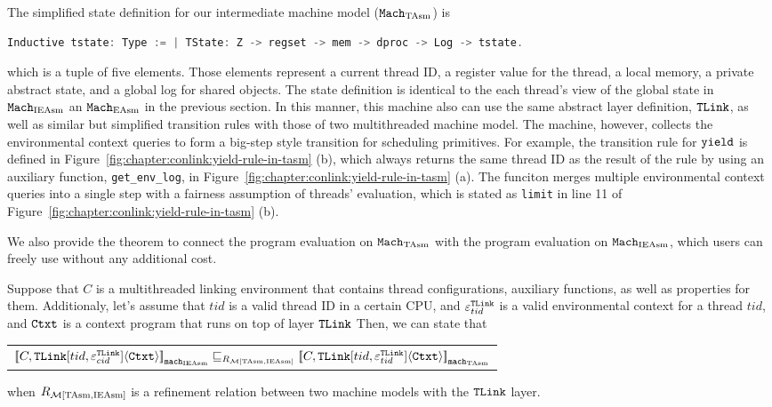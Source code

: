 The simplified state definition for our intermediate machine model (${\mathrm{\texttt{Mach}}}_{\mathrm{TAsm}}$) is
\begin{lstlisting}[language=C]
Inductive tstate: Type := | TState: Z -> regset -> mem -> dproc -> Log -> tstate.
\end{lstlisting}
which is a tuple of five elements. 
Those elements represent a current thread ID, 
a register value for the thread, a local memory, a private abstract state, and a global log for shared objects. 
The state definition is identical to the each thread's view of the global state in ${\mathrm{\texttt{Mach}}}_{\mathrm{IEAsm}}$ an ${\mathrm{\texttt{Mach}}}_{\mathrm{EAsm}}$ in the previous section. 
In this manner,
this machine also can use the same abstract layer definition, ${{\mathrm{\texttt{TLink}}}}$, 
as well as similar but simplified transition rules with those of two multithreaded machine model.
The machine, however,
 collects the environmental context queries to form a big-step style transition for scheduling primitives. 
 For example, 
 the transition rule for ${\mathrm{\texttt{yield}}}$ is defined in Figure~\ref{fig:chapter:conlink:yield-rule-in-tasm} (b),
 which always returns the same thread ID as the result of the rule 
 by using 
 an auxiliary function, \lstinline$get_env_log$, in  Figure~\ref{fig:chapter:conlink:yield-rule-in-tasm} (a).
 The funciton   merges multiple environmental context queries into a single step with a fairness assumption
 of threads' evaluation, which is stated as \lstinline$limit$ in line 11 of  Figure~\ref{fig:chapter:conlink:yield-rule-in-tasm} (b).

We also provide 
the theorem to connect the program evaluation on ${\mathrm{\texttt{Mach}}}_{\mathrm{TAsm}}$
with the program evaluation on ${\mathrm{\texttt{Mach}}}_{\mathrm{IEAsm}}$,
which users can freely use without any additional cost.

\begin{lemma}
\label{lemma:chapter:conlink:ieasm-refines-tasm}
Suppose that $C$ is a multithreaded linking environment that contains thread configurations, auxiliary functions, as well as properties for them. 
Additionaly, let's assume that 
 $tid$ is a valid thread ID in a certain CPU,
and 
 ${\varepsilon}^{{{\mathrm{\texttt{TLink}}}}}_{tid}$ is a valid
environmental context for a thread $tid$, 
and ${\mathrm{\texttt{Ctxt}}}$ is a
 context program that runs on top of layer ${{\mathrm{\texttt{TLink}}}}$
 Then, we can state that
 \begin{center}
\begin{tabular}{c}
${[\![{C, {{\mathrm{\texttt{TLink}}}}[tid, {\varepsilon}^{{{\mathrm{\texttt{TLink}}}}}_{cid}]} \langle {{\mathrm{\texttt{Ctxt}}}} \rangle]\!]}_{{\mathrm{\texttt{mach}}}_{\mathrm{IEAsm}}} \sqsubseteq_{R_{\mathcal{M}{[\mathrm{TAsm}, \mathrm{IEAsm}]}}} {[\![{C, {{\mathrm{\texttt{TLink}}}}[tid, {\varepsilon}^{{{\mathrm{\texttt{TLink}}}}}_{tid}]} \langle {{\mathrm{\texttt{Ctxt}}}} \rangle]\!]}_{{{\mathrm{\texttt{mach}}}_{\mathrm{TAsm}}}}$\\
\end{tabular}
\end{center}
when $R_{\mathcal{M}{[\mathrm{TAsm}, \mathrm{IEAsm}]}}$ is a refinement relation between two machine models with the  ${{\mathrm{\texttt{TLink}}}}$ layer.
\end{lemma}



